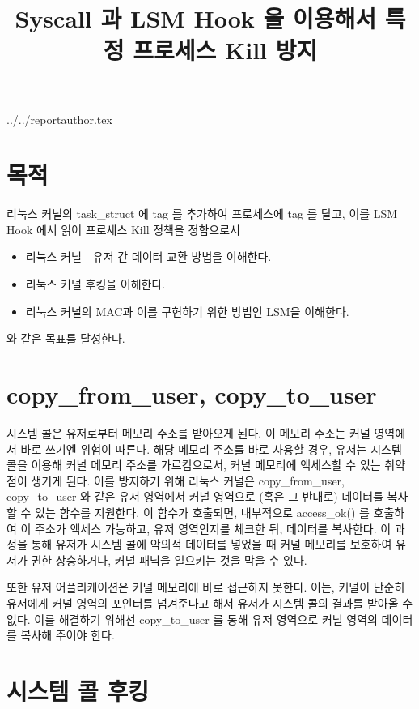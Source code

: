 \documentclass {article}
\begin{document}
\title {Syscall 과 LSM Hook 을 이용해서 특정 프로세스 Kill 방지}
 {../../reportauthor.tex}
\maketitle

\section {목적}
리눅스 커널의 task\_struct 에 tag 를 추가하여 프로세스에 tag 를 달고, 이를 LSM Hook 에서 읽어 프로세스 Kill 정책을 정함으로서

\vspace{\baselineskip}
\begin {itemize}
  \item 리눅스 커널 - 유저 간 데이터 교환 방법을 이해한다.
  \item 리눅스 커널 후킹을 이해한다.
  \item 리눅스 커널의 MAC과 이를 구현하기 위한 방법인 LSM을 이해한다.
\end {itemize}
\vspace{\baselineskip}

와 같은 목표를 달성한다.

\section {copy\_from\_user, copy\_to\_user}
시스템 콜은 유저로부터 메모리 주소를 받아오게 된다. 이 메모리 주소는 커널 영역에서 바로 쓰기엔 위험이 따른다. 해당 메모리 주소를 바로 사용할 경우, 유저는 시스템 콜을 이용해 커널 메모리 주소를 가르킴으로서, 커널 메모리에 액세스할 수 있는 취약점이 생기게 된다. 이를 방지하기 위해 리눅스 커널은 copy\_from\_user, copy\_to\_user 와 같은 유저 영역에서 커널 영역으로 (혹은 그 반대로) 데이터를 복사할 수 있는 함수를 지원한다. 이 함수가 호출되면, 내부적으로 access\_ok() 를 호출하여 이 주소가 액세스 가능하고, 유저 영역인지를 체크한 뒤, 데이터를 복사한다. 이 과정을 통해 유저가 시스템 콜에 악의적 데이터를 넣었을 때 커널 메모리를 보호하여 유저가 권한 상승하거나, 커널 패닉을 일으키는 것을 막을 수 있다.

또한 유저 어플리케이션은 커널 메모리에 바로 접근하지 못한다. 이는, 커널이 단순히 유저에게 커널 영역의 포인터를 넘겨준다고 해서 유저가 시스템 콜의 결과를 받아올 수 없다. 이를 해결하기 위해선 copy\_to\_user 를 통해 유저 영역으로 커널 영역의 데이터를 복사해 주어야 한다.

\section {시스템 콜 후킹}
\end{document}
